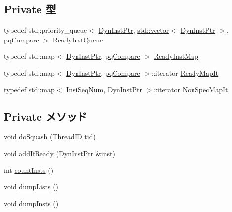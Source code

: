 \subsection*{Private 型}
\begin{DoxyCompactItemize}
\item 
typedef std::priority\_\-queue$<$ \hyperlink{classInstQueue_a028ce10889c5f6450239d9e9a7347976}{DynInstPtr}, \hyperlink{classstd_1_1vector}{std::vector}$<$ \hyperlink{classInstQueue_a028ce10889c5f6450239d9e9a7347976}{DynInstPtr} $>$, \hyperlink{structInstQueue_1_1pqCompare}{pqCompare} $>$ \hyperlink{classInstQueue_a60636ae8f3b649078c4f1bdd3b20dcad}{ReadyInstQueue}
\item 
typedef std::map$<$ \hyperlink{classInstQueue_a028ce10889c5f6450239d9e9a7347976}{DynInstPtr}, \hyperlink{structInstQueue_1_1pqCompare}{pqCompare} $>$ \hyperlink{classInstQueue_afca3a0ab9af7309428eb77c726724000}{ReadyInstMap}
\item 
typedef std::map$<$ \hyperlink{classInstQueue_a028ce10889c5f6450239d9e9a7347976}{DynInstPtr}, \hyperlink{structInstQueue_1_1pqCompare}{pqCompare} $>$::iterator \hyperlink{classInstQueue_a2ab2a44e2b7c4b408ceda3a9a2422ecb}{ReadyMapIt}
\item 
typedef std::map$<$ \hyperlink{inst__seq_8hh_a258d93d98edaedee089435c19ea2ea2e}{InstSeqNum}, \hyperlink{classInstQueue_a028ce10889c5f6450239d9e9a7347976}{DynInstPtr} $>$::iterator \hyperlink{classInstQueue_a0e9597437fae9e60d5449933949416ec}{NonSpecMapIt}
\end{DoxyCompactItemize}
\subsection*{Private メソッド}
\begin{DoxyCompactItemize}
\item 
void \hyperlink{classInstQueue_a06cf52c4f09162bea03ec848f247151a}{doSquash} (\hyperlink{base_2types_8hh_ab39b1a4f9dad884694c7a74ed69e6a6b}{ThreadID} tid)
\item 
void \hyperlink{classInstQueue_a7e3f1fa43ca939ed6fd9b3abcc47f06e}{addIfReady} (\hyperlink{classInstQueue_a028ce10889c5f6450239d9e9a7347976}{DynInstPtr} \&inst)
\item 
int \hyperlink{classInstQueue_ab654970f03abd90f0c397bba8e218bc9}{countInsts} ()
\item 
void \hyperlink{classInstQueue_a3d1dae45e8e0b5cf7c1f4f8c796d070e}{dumpLists} ()
\item 
void \hyperlink{classInstQueue_a80587b4fe043bbe1995536cb3b361588}{dumpInsts} ()
\end{DoxyCompactItemize}
